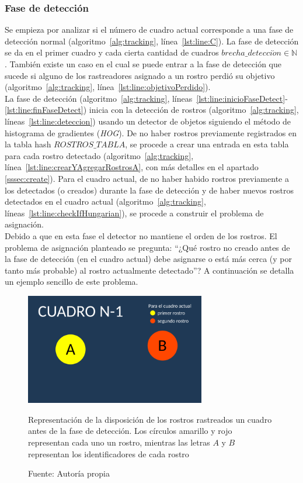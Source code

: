 \documentclass[a4paper,openright,12pt]{report}
\begin{document}
\subsubsection{Fase de detección}
Se empieza por analizar si el número de cuadro actual corresponde a una fase de
detección normal (algoritmo~\ref{alg:tracking}, línea~\ref{lst:line:C}).
La fase de detección se da en el primer cuadro
y cada cierta cantidad de cuadros $brecha\_detecci\acute on \in \mathbb{N}$.
También existe un caso en el cual se puede entrar a la fase de detección que
sucede si alguno de los rastreadores asignado a un rostro perdió su objetivo
(algoritmo~\ref{alg:tracking}, línea~\ref{lst:line:objetivoPerdido}).\\
La fase de detección
(algoritmo~\ref{alg:tracking}, líneas~\ref{lst:line:inicioFaseDetect}-\ref{lst:line:finFaseDetect})
inicia con la detección de rostros
(algoritmo~\ref{alg:tracking}, líneas~\ref{lst:line:deteccion}) usando un
detector de objetos siguiendo el método de histograma de gradientes
(\textit{HOG}). De no haber rostros previamente registrados en la tabla hash
$ROSTROS\_TABLA$, se procede a crear una entrada en esta tabla para cada
rostro detectado (algoritmo~\ref{alg:tracking},
línea~\ref{lst:line:crearYAgregarRostrosA}, con más detalles en el apartado
\ref{sssec:create}). Para el cuadro actual, de no haber habido rostros
previamente a los detectados (o creados) durante la fase de detección y de haber
nuevos rostros detectados en el cuadro actual (algoritmo~\ref{alg:tracking},
líneas~\ref{lst:line:checkIfHungarian}), se procede a construir el problema de
asignación.\\
Debido a que en esta fase el detector no mantiene el orden de los rostros. El
problema de asignación planteado se pregunta: ``¿Qué rostro no creado antes de
la fase de detección (en el cuadro actual) debe asignarse o está más cerca (y
por tanto más probable) al rostro actualmente detectado''? A continuación se
detalla un ejemplo sencillo de este problema.\\

\begin{figure}[!h]
  \centering
    \includegraphics[width=0.7\textwidth]{../images/hungarian-example-1.png}\par
  \caption{Representación de la disposición de los rostros rastreados un cuadro
           antes de la fase de detección. Los círculos amarillo y rojo
           representan cada uno un rostro, mientras las letras $A$ y $B$
           representan los identificadores de cada rostro}
    \label{fig:hungarian-example-1}
  \caption*{Fuente: Autoría propia}
\end{figure}
\end{document}
